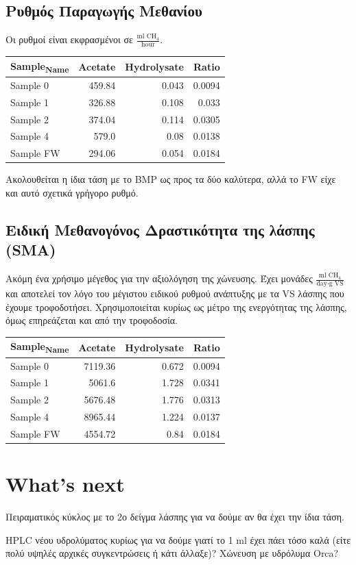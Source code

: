 \documentclass[11pt]{article}
\begin{document}
\subsection{Ρυθμός Παραγωγής Μεθανίου}
\label{sec:org5509a73}
Οι ρυθμοί είναι εκφρασμένοι σε \(\frac{\text{ml CH$_4$}}{\text{hour}}\).
\begin{center}
\begin{tabular}{lrrr}
Sample\textsubscript{Name} & Acetate & Hydrolysate & Ratio\\[0pt]
\hline
Sample 0 & 459.84 & 0.043 & 0.0094\\[0pt]
Sample 1 & 326.88 & 0.108 & 0.033\\[0pt]
Sample 2 & 374.04 & 0.114 & 0.0305\\[0pt]
Sample 4 & 579.0 & 0.08 & 0.0138\\[0pt]
Sample FW & 294.06 & 0.054 & 0.0184\\[0pt]
\end{tabular}
\end{center}

Ακολουθείται η ίδια τάση με το BMP ως προς τα δύο καλύτερα, αλλά το FW είχε και αυτό σχετικά γρήγορο ρυθμό.

\subsection{Ειδική Μεθανογόνος Δραστικότητα της λάσπης (SMA)}
\label{sec:org4b79992}
Ακόμη ένα χρήσιμο μέγεθος για την αξιολόγηση της χώνευσης. Έχει μονάδες \(\frac{\text{ml CH$_4$}}{\text{day} \cdot \text{g VS}}\) και αποτελεί τον λόγο του μέγιστου ειδικού ρυθμού ανάπτυξης με τα VS λάσπης που έχουμε τροφοδοτήσει. Χρησιμοποιείται κυρίως ως μέτρο της ενεργότητας της λάσπης, όμως επηρεάζεται και από την τροφοδοσία.

\begin{center}
\begin{tabular}{lrrr}
Sample\textsubscript{Name} & Acetate & Hydrolysate & Ratio\\[0pt]
\hline
Sample 0 & 7119.36 & 0.672 & 0.0094\\[0pt]
Sample 1 & 5061.6 & 1.728 & 0.0341\\[0pt]
Sample 2 & 5676.48 & 1.776 & 0.0313\\[0pt]
Sample 4 & 8965.44 & 1.224 & 0.0137\\[0pt]
Sample FW & 4554.72 & 0.84 & 0.0184\\[0pt]
\end{tabular}
\end{center}

\section{What's next}
\label{sec:orgc77b4fb}
Πειραματικός κύκλος με το 2ο δείγμα λάσπης για να δούμε αν θα έχει την ίδια τάση.

HPLC νέου υδρολύματος κυρίως για να δούμε γιατί το 1 ml έχει πάει τόσο καλά (είτε πολύ υψηλές αρχικές συγκεντρώσεις ή κάτι άλλαξε)?
Χώνευση με υδρόλυμα Orca?
\end{document}
